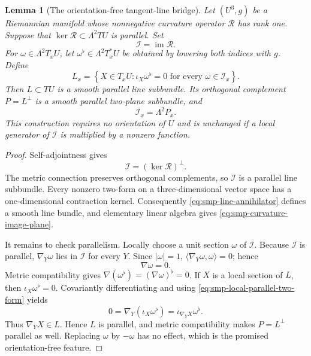 \documentclass[10pt]{coll-l}
\newtheorem{lemma}[theorem]{Lemma}
\theoremstyle{definition}
\theoremstyle{remark}
\numberwithin{section}{chapter}
\numberwithin{equation}{chapter}
\begin{document}
\begin{lemma}[The orientation-free tangent-line bridge]
\label{lem:curvature-image-to-parallel-line}
Let $(U^3,g)$ be a Riemannian manifold whose nonnegative curvature operator
$\mathcal R$ has rank one.  Suppose that
$\ker\mathcal R\subset\Lambda^2TU$ is parallel.  Set
\[
                 \mathcal I=\operatorname{im}\mathcal R.
\]
For $\omega\in\Lambda^2T_xU$, let $\omega^\flat\in\Lambda^2T_x^*U$ be
obtained by lowering both indices with $g$.  Define
\begin{equation}
 L_x=\left\{X\in T_xU:\iota_X\omega^\flat=0
                  \text{ for every }\omega\in\mathcal I_x\right\}.
                                                        \label{eq:smp-line-annihilator}
\end{equation}
Then $L\subset TU$ is a smooth parallel line subbundle.  Its orthogonal
complement $P=L^\perp$ is a smooth parallel two-plane subbundle, and
\begin{equation}
                 \mathcal I_x=\Lambda^2P_x.
                                                        \label{eq:smp-curvature-image-plane}
\end{equation}
This construction requires no orientation of $U$ and is unchanged if a
local generator of $\mathcal I$ is multiplied by a nonzero function.
\end{lemma}

\begin{proof}
Self-adjointness gives
\[
       \mathcal I=(\ker\mathcal R)^\perp.
\]
The metric connection preserves orthogonal complements, so $\mathcal I$ is
a parallel line subbundle.  Every nonzero two-form on a three-dimensional
vector space has a one-dimensional contraction kernel.  Consequently
\eqref{eq:smp-line-annihilator} defines a smooth line bundle, and elementary
linear algebra gives \eqref{eq:smp-curvature-image-plane}.

It remains to check parallelism.  Locally choose a unit section $\omega$ of
$\mathcal I$.  Because $\mathcal I$ is parallel, $\nabla_Y\omega$ lies in
$\mathcal I$ for every $Y$.  Since $|\omega|=1$,
$\langle\nabla_Y\omega,\omega\rangle=0$; hence
\begin{equation}
                         \nabla\omega=0.                 \label{eq:smp-local-parallel-two-form}
\end{equation}
Metric compatibility gives $\nabla(\omega^\flat)=(\nabla\omega)^\flat=0$.
If $X$ is a local section of $L$, then $\iota_X\omega^\flat=0$.  Covariantly
differentiating and using \eqref{eq:smp-local-parallel-two-form} yields
\[
                 0=\nabla_Y(\iota_X\omega^\flat)
                   =\iota_{\nabla_YX}\omega^\flat.
\]
Thus $\nabla_YX\in L$.  Hence $L$ is parallel, and metric compatibility
makes $P=L^\perp$ parallel as well.  Replacing $\omega$ by $-\omega$ has no
effect, which is the promised orientation-free feature.
\end{proof}
\end{document}
